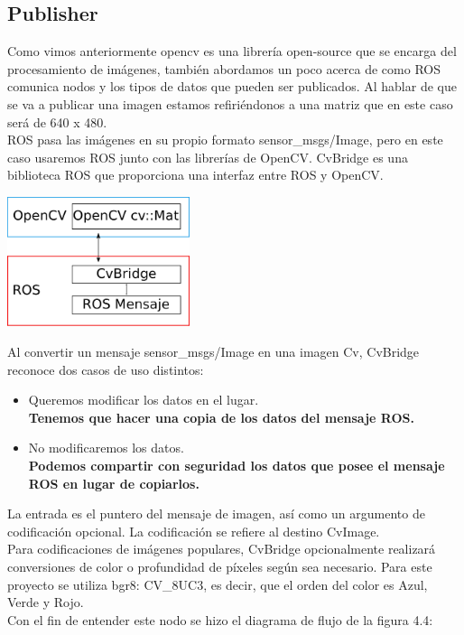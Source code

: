 \subsection{Publisher}
Como vimos anteriormente opencv es una librería open-source que se encarga del procesamiento
de imágenes, también abordamos un poco acerca de como ROS comunica nodos y los
tipos de datos que pueden ser publicados. Al hablar de que se va a publicar una imagen
estamos refiriéndonos a una matriz que en este caso será de 640 x 480.\\
ROS pasa las imágenes en su propio formato sensor\_msgs/Image, pero
en este caso usaremos ROS junto con las librerías de OpenCV. CvBridge es una
biblioteca ROS que proporciona una interfaz entre ROS y OpenCV.
\begin{center}
	\includegraphics[width=0.4\textwidth]{Contenido/Cuerpo/Capitulo4/Fig1.eps}
	\label{Fig1}
\end{center}
Al convertir un mensaje sensor\_msgs/Image en una imagen Cv, CvBridge
reconoce dos casos de uso distintos:
\begin{itemize}
	\item Queremos modificar los datos en el lugar.\\
	      \textbf{Tenemos que hacer una copia de los datos del mensaje ROS.}
	\item No modificaremos los datos.\\
	      \textbf{Podemos compartir con seguridad los datos que posee el mensaje ROS en lugar de copiarlos.}
\end{itemize}
La entrada es el puntero del mensaje de imagen, así como un argumento de
codificación opcional. La codificación se refiere al destino CvImage.\\
Para codificaciones de imágenes populares, CvBridge opcionalmente realizará
conversiones de color o profundidad de píxeles según sea necesario. Para este proyecto
se utiliza bgr8: CV\_8UC3, es decir, que el orden del color es Azul, Verde y Rojo.\\
Con el fin de entender este nodo se hizo el diagrama de flujo de la figura 4.4:
